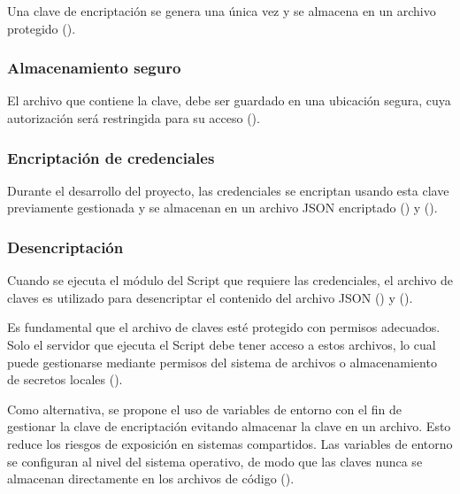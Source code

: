 \documentclass[letter,oneside,12pt,spanish]{report}
\begin{document}
\noindent Una clave de encriptación se genera una única vez y se almacena en un archivo protegido (\cite{microsoft2023securitygovernance}).

\subsubsection{Almacenamiento seguro}

\noindent El archivo que contiene la clave, debe ser guardado en una ubicación segura, cuya autorización será restringida para su acceso (\cite{microsoft2023securitygovernance}).

\subsubsection{Encriptación de credenciales}

\noindent Durante el desarrollo del proyecto, las credenciales se encriptan usando esta clave previamente gestionada y se almacenan en un archivo JSON encriptado (\cite{microsoft2023securitygovernance}) y (\cite{python2024cryptography}).

\subsubsection{Desencriptación}
\noindent Cuando se ejecuta el módulo del Script que requiere las credenciales, el archivo de claves es utilizado para desencriptar el contenido del archivo JSON (\cite{microsoft2023securitygovernance}) y (\cite{python2024cryptography}).


\noindent Es fundamental que el archivo de claves esté protegido con permisos adecuados. Solo el servidor que ejecuta el Script debe tener acceso a estos archivos, lo cual puede gestionarse mediante permisos del sistema de archivos o almacenamiento de secretos locales (\cite{oracle2024pythondriver}).

\noindent Como alternativa, se propone el uso de variables de entorno con el fin de gestionar la clave de encriptación evitando almacenar la clave en un archivo. Esto reduce los riesgos de exposición en sistemas compartidos. Las variables de entorno se configuran al nivel del sistema operativo, de modo que las claves nunca se almacenan directamente en los archivos de código (\cite{microsoft2024apikeys}).
\end{document}
